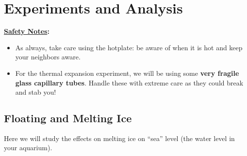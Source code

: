 
\newpage


\section{Experiments and Analysis}

{\bf \underline{Safety Notes}:} 
	\begin{itemize}
	\item As always, take care using the hotplate: be aware of when it is hot and keep your neighbors aware.  
	\item For the thermal expansion experiment, we will be using some {\bf very fragile glass capillary tubes}.  Handle these with extreme care as they could break and stab you!
	\end{itemize}

\subsection{Floating and Melting Ice}

Here we will study the effects on melting ice on ``sea'' level (the water level in your aquarium).  

